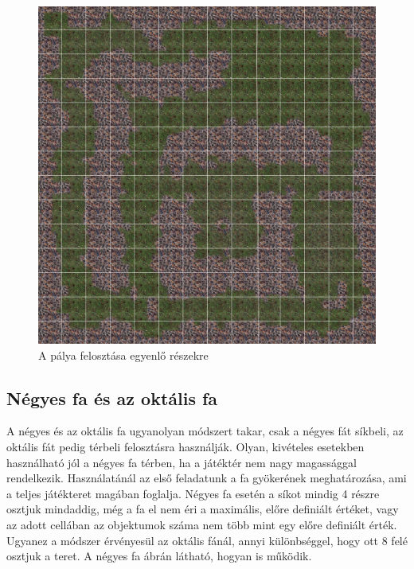 \begin{figure}[h]
\centering
\includegraphics[scale=0.2]{kepek/grid.png}
\caption{A pálya felosztása egyenlő részekre}
\label{fig:grid}
\end{figure}

\subsection{Négyes fa és az oktális fa}

A négyes és az oktális fa ugyanolyan módszert takar, csak a négyes fát síkbeli, az oktális fát pedig térbeli felosztásra használják. Olyan, kivételes esetekben használható jól a négyes fa térben, ha a játéktér nem nagy magassággal rendelkezik. Használatánál az első feladatunk a fa gyökerének meghatározása, ami a teljes játékteret magában foglalja. Négyes fa esetén a síkot mindig 4 részre osztjuk mindaddig, még a fa el nem éri a maximális, előre definiált értéket, vagy az adott cellában az objektumok száma nem több mint egy előre definiált érték. Ugyanez a módszer érvényesül az oktális fánál, annyi különbséggel, hogy ott 8 felé osztjuk a teret. A négyes fa  ábrán látható, hogyan is működik.

